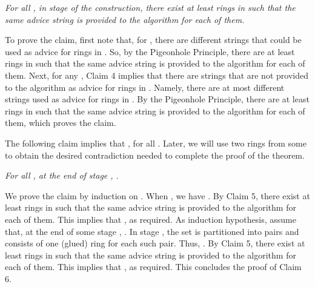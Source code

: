 \documentclass[11pt]{article}
\newcommand{\qed}{\hfill  \bigbreak}
\newenvironment{proof}{\noindent {\bf Proof.}}{\qed}
\begin{document}
\begin{proof}
\vspace{3mm} 
\textit{For all , in stage  of the construction, there exist at least  rings in  such that the same advice string is provided to the algorithm for each of them.}
\vspace{3mm}

To prove the claim, first note that, for , there are  different strings that could be used as advice for rings in . So, by the Pigeonhole Principle, there are at least  rings in  such that the same advice string is provided to the algorithm for each of them. Next, for any , Claim 4 implies that there are  strings that are not provided to the algorithm as advice for rings in . Namely, there are at most  different strings used as advice for rings in . By the Pigeonhole Principle, there are at least  rings in  such that the same advice string is provided to the algorithm for each of them, which proves the claim.

The following claim implies that , for all . Later, we will use two rings from some  to obtain the desired contradiction needed to complete the proof of the theorem. 

\vspace{3mm} 
\textit{For all , at the end of stage , .}
\vspace{3mm} 

We prove the claim by induction on . When , we have . By Claim 5, there exist at least  rings in  such that the same advice string is provided to the algorithm for each of them. This implies that , as required. As induction hypothesis, assume that, at the end of some stage , . In stage , the set  is partitioned into pairs and  consists of one (glued) ring for each such pair. Thus, . By Claim 5, there exist at least  rings in  such that the same advice string is provided to the algorithm for each of them. This implies that , as required. This concludes the proof of Claim 6.


\end{proof}
\end{document}
